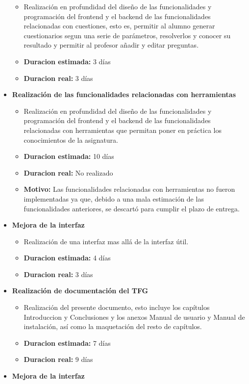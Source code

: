 \documentclass[openright,twoside,10pt]{book}
\providecommand{\tightlist}{%
  \setlength{\itemsep}{0pt}\setlength{\parskip}{0pt}}
\begin{document}
\begin{itemize}
      \begin{itemize}
      \tightlist
      \item
        Realización en profundidad del diseño de las funcionalidades y
        programación del frontend y el backend de las funcionalidades
        relacionadas con cuestiones, esto es, permitir al alumno generar
        cuestionarios segun una serie de parámetros, resolverlos y conocer
        su resultado y permitir al profesor añadir y editar preguntas.
      \item
        \textbf{Duracion estimada:} 3 días
      \item
        \textbf{Duracion real:} 3 días
      \end{itemize}
    \item
      \textbf{Realización de las funcionalidades relacionadas con
      herramientas}
    
      \begin{itemize}
      \tightlist
      \item
        Realización en profundidad del diseño de las funcionalidades y
        programación del frontend y el backend de las funcionalidades
        relacionadas con herramientas que permitan poner en práctica los
        conocimientos de la asignatura.
      \item
        \textbf{Duracion estimada:} 10 días
      \item
        \textbf{Duracion real:} No realizado
      \item
        \textbf{Motivo:} Las funcionalidades relacionadas con herramientas
        no fueron implementadas ya que, debido a una mala estimación de las
        funcionalidades anteriores, se descartó para cumplir el plazo de
        entrega.
      \end{itemize}
    \item
      \textbf{Mejora de la interfaz}
    
      \begin{itemize}
      \tightlist
      \item
        Realización de una interfaz mas allá de la interfaz útil.
      \item
        \textbf{Duracion estimada:} 4 días
      \item
        \textbf{Duracion real:} 3 días
      \end{itemize}
    \item
      \textbf{Realización de documentación del TFG}
    
      \begin{itemize}
      \tightlist
      \item
        Realización del presente documento, esto incluye los capítulos
        Introduccion y Conclusiones y los anexos Manual de usuario y Manual
        de instalación, así como la maquetación del resto de capítulos.
      \item
        \textbf{Duracion estimada:} 7 días
      \item
        \textbf{Duracion real:} 9 días
      \end{itemize}
    \item
      \textbf{Mejora de la interfaz}
    

\end{itemize}
\end{document}
